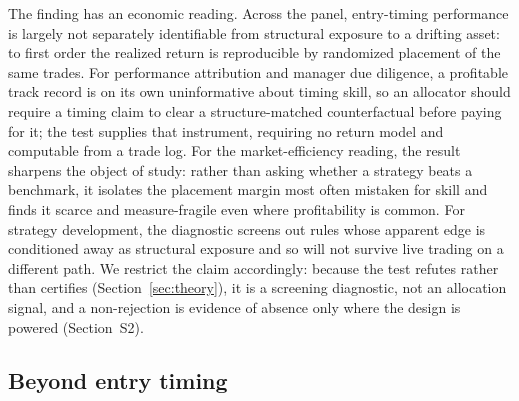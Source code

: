 \documentclass[preprint,12pt]{elsarticle}
\theoremstyle{definition}
\begin{document}
The finding has an economic reading. Across the panel, entry-timing performance
is largely not separately identifiable from structural exposure to a drifting asset: to
first order the realized return is reproducible by randomized placement of the same trades.
For performance attribution and manager due diligence, a profitable track record is on its
own uninformative about timing skill, so an allocator should require a timing claim to
clear a structure-matched counterfactual before paying for it; the test supplies that
instrument, requiring no return model and computable from a trade log. For the
market-efficiency reading, the result sharpens the object of study: rather than asking
whether a strategy beats a benchmark, it isolates the placement margin most often mistaken
for skill and finds it scarce and measure-fragile even where profitability is common. For
strategy development, the diagnostic screens out rules whose apparent edge is conditioned
away as structural exposure and so will not survive live trading on a different path. We
restrict the claim accordingly: because the test refutes rather than certifies
(Section~\ref{sec:theory}), it is a screening diagnostic, not an allocation signal, and a
non-rejection is evidence of absence only where the design is powered (Section~S2).

\subsection{Beyond entry timing}
\label{sec:discussion-general}
\end{document}

